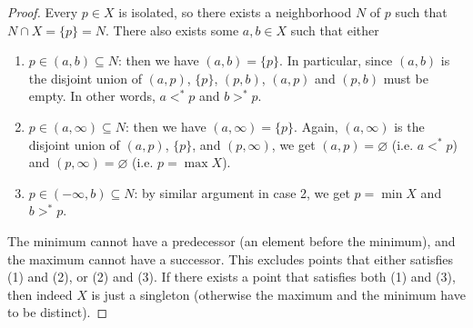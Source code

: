 \documentclass{treatise}
\begin{document}
\begin{proof}
Every $p \in X$ is isolated, so there exists a neighborhood $N$ of $p$ such that $N \cap X = \{ p \} = N$. There also exists some $a, b \in X$ such that either
\begin{enumerate}
    \item $p \in (a, b) \subseteq N$: then we have $(a, b) = \{ p \}$. In particular, since $(a, b)$ is the disjoint union of $(a, p)$, $\{ p \}$, $(p, b)$, $(a, p)$ and $(p, b)$ must be empty. In other words, $a <^* p$ and $b >^* p$.
    \item $p \in (a, \infty) \subseteq N$: then we have $(a, \infty) = \{ p \}$. Again, $(a, \infty)$ is the disjoint union of $(a, p)$, $\{ p \}$, and $(p, \infty)$, we get $(a, p) = \varnothing$ (i.e. $a <^* p$) and $(p, \infty) = \varnothing$ (i.e. $p = \max X$).
    \item $p \in (-\infty, b) \subseteq N$: by similar argument in case 2, we get $p = \min X$ and $b >^* p$.
\end{enumerate}
The minimum cannot have a predecessor (an element before the minimum), and the maximum cannot have a successor. This excludes points that either satisfies (1) and (2), or (2) and (3). If there exists a point that satisfies both (1) and (3), then indeed $X$ is just a singleton (otherwise the maximum and the minimum have to be distinct).
\end{proof}
\end{document}
